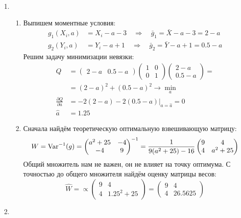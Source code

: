 \begin{enumerate}
\item
\begin{enumerate}
\item Выпишем моментные условия:
\begin{align*}
g_1(X_i, a) &= X_i - a - 3 \quad \Rightarrow \quad \bar{g}_1 = \bar X - a - 3 = 2 - a  \\
g_2(Y_i, a) &= Y_i - a + 1 \quad \Rightarrow \quad \bar{g}_2 = \bar Y - a + 1 = 0.5 - a
\end{align*}
Решим задачу минимизации невязки:
\begin{align*}
Q &= \begin{pmatrix}
2 - a &  0.5 - a
\end{pmatrix}
\begin{pmatrix}
1 & 0 \\
0 & 1
\end{pmatrix}
\begin{pmatrix}
2 - a \\
0.5 - a
\end{pmatrix} = \\
&= \left(2 - a \right)^2 + \left(0.5 - a \right)^2 \to \min_a \\
\frac{\partial Q}{\partial a} &= \left. -2(2 - a) - 2(0.5 - a) \right|_{a = \hat a} = 0 \\
\hat a &= 1.25
\end{align*}
\item Сначала найдём теоретическую оптимальную взвешивающую матрицу:
\[
W = \operatorname{Var}^{-1}(g) =
\begin{pmatrix}
a^2 + 25 & -4 \\
-4 & 9
\end{pmatrix}^{-1} =
\frac{1}{9(a^2 + 25)-16}
\begin{pmatrix}
9 & 4 \\
4 & a^2 + 25
\end{pmatrix}
\]
Общий множитель нам не важен, он не влияет на точку оптимума. С точностью до общего множителя найдём оценку матрицы весов:
\[
\widehat W = \propto
\begin{pmatrix}
9 & 4 \\
4 & 1.25^2 + 25
\end{pmatrix}
=
\begin{pmatrix}
9 & 4 \\
4 & 26.5625
\end{pmatrix}
\]
\end{enumerate}
\item
\begin{enumerate}

\end{enumerate}
\end{enumerate}
